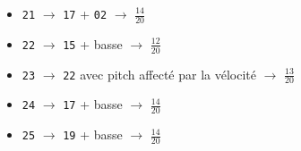 \documentclass[a4paper, 13pt]{article}
\begin{document}
\begin{itemize}
    \item \texttt{21} $\rightarrow$ \texttt{17} + \texttt{02} $\rightarrow$ \Large{$\frac{14}{20}$} \normalsize \vspace{0.2cm}
    \item \texttt{22} $\rightarrow$ \texttt{15} + basse $\rightarrow$ \Large{$\frac{12}{20}$} \normalsize \vspace{0.2cm}
    \item \texttt{23} $\rightarrow$ \texttt{22} avec pitch affecté par la vélocité $\rightarrow$ \Large{$\frac{13}{20}$} \normalsize \vspace{0.2cm}
    \item \texttt{24} $\rightarrow$ \texttt{17} + basse $\rightarrow$ \Large{$\frac{14}{20}$} \normalsize \vspace{0.2cm}
    \item \texttt{25} $\rightarrow$ \texttt{19} + basse $\rightarrow$ \Large{$\frac{14}{20}$} \normalsize \vspace{0.2cm}
\end{itemize}


\vspace{1cm}
\end{document}
